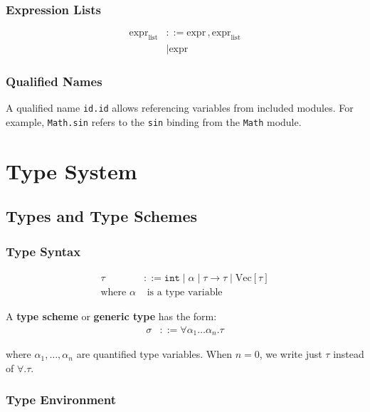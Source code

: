 \documentclass[12pt]{article}
\newcommand{\type}{\tau}
\begin{document}
\subsubsection{Expression Lists}

\begin{align*}
\text{expr}_{\text{list}} &::= \text{expr} \, \texttt{,} \, \text{expr}_{\text{list}} \\
                          &\mid \text{expr}
\end{align*}

\subsubsection{Qualified Names}

A qualified name \texttt{id.id} allows referencing variables from included modules. For example, \texttt{Math.sin} refers to the \texttt{sin} binding from the \texttt{Math} module.

\section{Type System}

\subsection{Types and Type Schemes}

\subsubsection{Type Syntax}

\begin{align*}
\type &::= \mathtt{int} \mid \alpha \mid \type \to \type \mid \text{Vec}[\type] \\
\text{where } \alpha &\text{ is a type variable}
\end{align*}

A \textbf{type scheme} or \textbf{generic type} has the form:
\begin{align*}
\sigma &::= \forall \alpha_1 \ldots \alpha_n . \type
\end{align*}

where $\alpha_1, \ldots, \alpha_n$ are quantified type variables. When $n = 0$, we write just $\type$ instead of $\forall . \type$.

\subsubsection{Type Environment}
\end{document}
